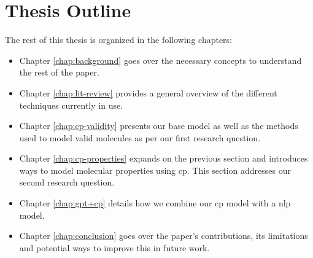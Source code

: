 \documentclass[../Document.tex]{subfiles}
\begin{document}
\section{Thesis Outline}
\label{sec:intro/outline}
The rest of this thesis is organized in the following chapters:

\begin{itemize}
    \item Chapter \ref{chap:background} goes over the necessary concepts to understand the rest of the paper.
    \item Chapter \ref{chap:lit-review} provides a general overview of the different techniques currently in use.
    \item Chapter \ref{chap:cp-validity} presents our base model as well as the methods used to model valid molecules as per our first research question.
    \item Chapter \ref{chap:cp-properties} expands on the previous section and introduces ways to model molecular properties using \acrshort{cp}. This section addresses our second research question.
    \item Chapter \ref{chap:gpt+cp} details how we combine our \acrshort{cp} model 
    with a \acrshort{nlp} model.
    \item Chapter \ref{chap:conclusion} goes over the paper's contributions, its limitations and potential ways to improve this in future work.
\end{itemize}
\end{document}
